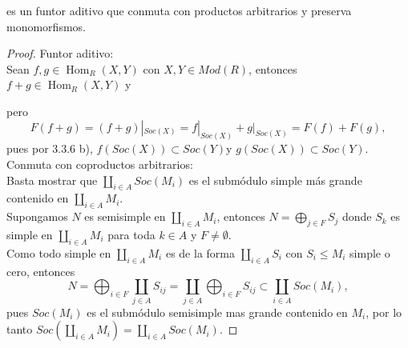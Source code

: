 \documentclass{article}
\begin{document}
\begin{enumerate}[label=\textbf{Ej \arabic*.}]
es un funtor aditivo que conmuta con productos arbitrarios y preserva monomorfismos.
\begin{proof}
Funtor aditivo:\\
Sean $f,g\in  \operatorname{Hom}_R(X,Y)$ con $X,Y\in Mod(R)$, entonces $f+g\in \operatorname{Hom}_R(X,Y)$ y 
pero \[F(f+g)=(f+g)|_{Soc(X)}=f|_{Soc(X)}+g|_{Soc(X)}=F(f)+F(g),
\]
pues por 3.3.6 b), $f(Soc(X))\subset Soc(Y)$\quad y \quad $g(Soc(X))\subset Soc(Y).$\\

Conmuta con coproductos arbitrarios:\\

Basta mostrar que $\displaystyle\coprod_{i\in A}Soc(M_i)$ es el submódulo simple más grande contenido en $\displaystyle\coprod_{i\in A}M_i$.\\
Supongamos $N$ es semisimple en $\displaystyle\coprod_{i\in A}M_i$, entonces $N=\displaystyle\bigoplus_{j\in F}S_j$ donde $S_k$ es simple en
$\displaystyle\coprod_{i\in A}M_i$ para toda $k\in A$ y $F\neq \emptyset$.\\

Como todo simple en $\displaystyle\coprod_{i\in A}M_i$ es de la forma $\displaystyle\coprod_{i\in A}S_i$ con $S_i\leq M_i$ simple o cero, 
entonces
\[
N=\bigoplus_{i\in F}\coprod_{j\in A}S_{ij}=\coprod_{j\in A}\bigoplus_{i\in F}S_{ij}\subset \coprod_{i\in A}Soc(M_i), 
\]
pues $Soc(M_i)$ es el submódulo semisimple mas grande contenido en $M_i$, por lo tanto 
$Soc(\displaystyle\coprod_{i\in A}M_i)=\displaystyle\coprod_{i\in A}Soc(M_i).$

\end{proof}


\end{enumerate}
\end{document}
